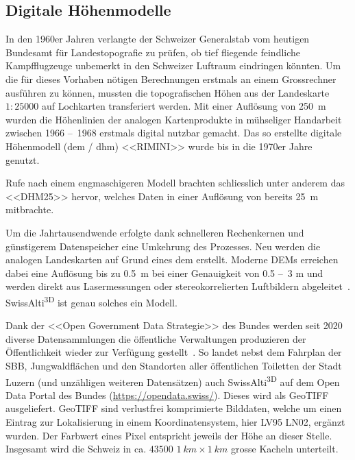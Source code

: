 \subsection{Digitale Höhenmodelle}\label{sec:dem}

In den 1960er Jahren verlangte der Schweizer Generalstab vom heutigen Bundesamt für Landestopografie zu prüfen, ob tief fliegende feindliche Kampfflugzeuge unbemerkt in den Schweizer Luftraum eindringen könnten. Um die für dieses Vorhaben nötigen Berechnungen erstmals an einem Grossrechner ausführen zu können, mussten die topografischen Höhen aus der Landeskarte $1:25000$ auf Lochkarten transferiert werden. Mit einer Auflösung von \qty{250}{m} wurden die Höhenlinien der analogen Kartenprodukte in mühseliger Handarbeit zwischen 1966 --~1968 erstmals digital nutzbar gemacht. Das so erstellte digitale Höhenmodell (\acrshort{dem} / \acrshort{dhm}) <<RIMINI>> wurde bis in die 1970er Jahre genutzt.~\cite{swisstopohistdem}

Rufe nach einem engmaschigeren Modell brachten schliesslich unter anderem das <<DHM25>> hervor, welches Daten in einer Auflösung von bereits \qty{25}{m} mitbrachte.~\cite{swisstopohistdem}

Um die Jahrtausendwende erfolgte dank schnelleren Rechenkernen und günstigerem Datenspeicher eine Umkehrung des Prozesses. Neu werden die analogen Landeskarten auf Grund eines \acrshort{dem} erstellt. Moderne DEMs erreichen dabei eine Auflösung bis zu \qty{0.5}{m} bei einer Genauigkeit von 0.5 --~3 \unit{m} und werden direkt aus Lasermessungen oder stereokorrelierten Luftbildern abgeleitet~\cite{alti3dprod}. SwissAlti\textsuperscript{3D} ist genau solches ein Modell.

Dank der <<Open Government Data Strategie>> des Bundes werden seit 2020 diverse Datensammlungen die öffentliche Verwaltungen produzieren der Öffentlichkeit wieder zur Verfügung gestellt~\cite{opendataswiss}.
So landet nebst dem Fahrplan der SBB, Jungwaldflächen und den Standorten aller öffentlichen Toiletten der Stadt Luzern (und unzähligen weiteren Datensätzen) auch  SwissAlti\textsuperscript{3D} auf dem Open Data Portal des Bundes (\url{https://opendata.swiss/}).
Dieses wird als GeoTIFF ausgeliefert. GeoTIFF sind verlustfrei komprimierte Bilddaten, welche um einen Eintrag zur Lokalisierung in einem Koordinatensystem, hier LV95 LN02, ergänzt wurden. Der Farbwert eines Pixel entspricht jeweils der Höhe an dieser Stelle. Insgesamt wird die Schweiz in ca. $43500$ $\qty{1}{km} \times \qty{1}{km}$ grosse Kacheln unterteilt.~\cite{alti3dprod} 

